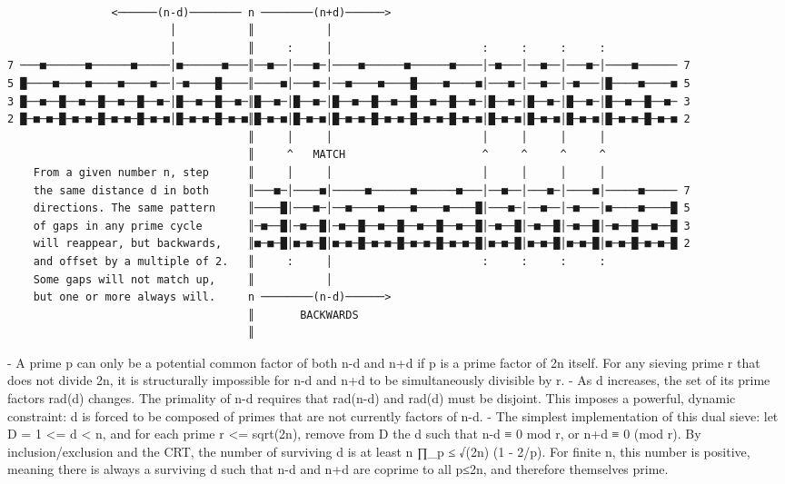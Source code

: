 \documentclass[12pt]{article}
\theoremstyle{plain}
\theoremstyle{definition}
\begin{document}
\begin{lstlisting}
                                     
                <──────(n-d)──────── n ────────(n+d)──────>
                         │           ║           │                  
                         │           ║     :     │                       :     :     :     :
7 ───■──────■──────■─────│■──────■───║──■──│───■─│────■──────■──────■────│─■───│──■──│───■─│────■────── 7
5 █────■────■────■────■──│─■────█────║────■│───■─│──■────■────█────■────■│───■─│──■──│─■───│█────■────■ 5
3 █──■──█──■──█──■──█──■─│█──■──█──■─║█──■─│█──■─│█──■──█──■──█──■──█──■─│█──■─│█──■─│█──■─│█──■──█──■─ 3
2 █─■─■─█─■─■─█─■─■─█─■─■│█─■─■─█─■─■║█─■─■│█─■─■│█─■─■─█─■─■─█─■─■─█─■─■│█─■─■│█─■─■│█─■─■│█─■─■─█─■─■ 2
                                     ║     │     │                       │     │     │     │           
                                     ║     ^   MATCH                     ^     ^     ^     ^     
    From a given number n, step      ║     │     │                       │     │     │     │           
    the same distance d in both      ║───■─│────■│─────■──────■──────■───│──■──│───■─│────■│─────■───── 7
    directions. The same pattern     ║────█│───■─│──■────■────■────■────█│───■─│──■──│─■───│■────■────█ 5
    of gaps in any prime cycle       ║─■──█│─■──█│─■──█──■──█──■──█──■──█│─■──█│─■──█│─■──█│─■──█──■──█ 3
    will reappear, but backwards,    ║■─■─█│■─■─█│■─■─█─■─■─█─■─■─█─■─■─█│■─■─█│■─■─█│■─■─█│■─■─█─■─■─█ 2
    and offset by a multiple of 2.   ║     :     │                       :     :     :     :
    Some gaps will not match up,     ║           │                       
    but one or more always will.     n ────────(n-d)──────>
                                     ║       BACKWARDS
                                     ║
\end{lstlisting}

- A prime p can only be a potential common factor of both n-d and n+d if p is a prime factor of 2n itself. For any sieving prime r that does not divide 2n, it is structurally impossible for n-d and n+d to be simultaneously divisible by r.
- As d increases, the set of its prime factors rad(d) changes. The primality of n-d requires that rad(n-d) and rad(d) must be disjoint. This imposes a powerful, dynamic constraint: d is forced to be composed of primes that are not currently factors of n-d.
- The simplest implementation of this dual sieve: let D = {1 <= d < n}, and for each prime r <= sqrt(2n), remove from D the d such that n-d ≡ 0 mod r, or n+d ≡ 0 (mod r). By inclusion/exclusion and the CRT, the number of surviving d is at least n ∏_{p ≤ √(2n)} (1 - 2/p). For finite n, this number is positive, meaning there is always a surviving d such that n-d and n+d are coprime to all p≤2n, and therefore themselves prime.







\begin{thebibliography}{9}

\end{thebibliography}
\end{document}
